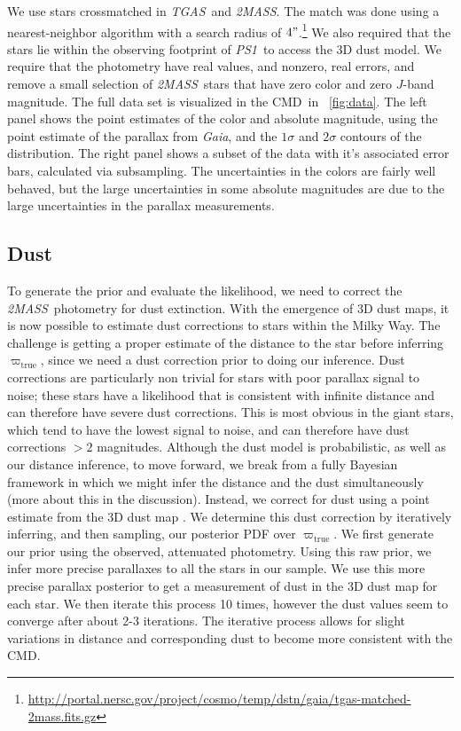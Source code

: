 \documentclass[modern]{aastex61}
\newcommand{\acronym}[1]{{\small{#1}}}
\newcommand{\project}[1]{\textsl{#1}}
\newcommand{\tgas}{\project{\acronym{TGAS}}}
\newcommand{\tmass}{\project{\acronym{2MASS}}}
\newcommand{\psone}{\project{\acronym{PS1}}}
\newcommand{\gaia}{\project{Gaia}}
\newcommand{\cmd}{\acronym{CMD}}
\newcommand{\true}{\mathrm{true}}
\begin{document}
We use stars crossmatched in \tgas\ and \tmass.
The match was done using a nearest-neighbor algorithm with a search radius of $4"$.\footnote{\url{http://portal.nersc.gov/project/cosmo/temp/dstn/gaia/tgas-matched-2mass.fits.gz}}
We also required that the stars lie within the
observing footprint of \psone\ to access the \cite{green15} 3D dust model.
We require that the photometry have real values, and nonzero, real errors, and
remove a small selection of \tmass\ stars that have zero color and zero $J$-band
magnitude.
The full data set is visualized in the \cmd\ in \figurename~\ref{fig:data}.
The left panel shows the point estimates of the color and absolute magnitude,
using the point estimate of the parallax from \gaia, and the $1\sigma$ and
$2\sigma$ contours of the distribution.
The right panel shows a subset of the data with it's associated error bars, calculated via subsampling.
The uncertainties in the colors are fairly well behaved, but the large
uncertainties in some absolute magnitudes are due to the large uncertainties in
the parallax measurements.

\subsection{Dust}

To generate the prior and evaluate the likelihood, we need to
correct the \tmass\ photometry for dust extinction.
With the emergence of 3D dust maps, it is now possible to estimate dust
corrections to stars within the Milky Way. The challenge is getting a
proper estimate of the distance to the star before inferring
$\varpi_{\true}$, since we need a dust correction prior to doing our
inference. Dust corrections are particularly non trivial for stars
with poor parallax signal to noise; these stars have
a likelihood that is consistent with infinite distance and can
therefore have severe dust corrections. This is most obvious in the
giant stars, which tend to have the lowest signal to noise, and can
therefore have dust corrections $> 2$ magnitudes. Although the dust
model is probabilistic, as well as our distance inference, to move
forward, we break from a fully Bayesian framework in which we might
infer the distance and the dust simultaneously (more about this in the
discussion). Instead, we correct for dust using a point estimate from
the 3D dust map \citep{green15}. We determine this dust correction by
iteratively inferring, and then sampling, our posterior PDF over
$\varpi_{\true}$. We first generate our prior using the observed,
attenuated photometry. Using this raw prior, we infer more precise
parallaxes to all the stars in our sample. We use this more
precise parallax posterior to get a measurement of dust in the 3D dust
map for each star. We then iterate this process 10 times, however
the dust values seem to converge after about 2-3 iterations. The
iterative process allows for slight variations in distance and
corresponding dust to become more consistent with the \cmd.
\end{document}

